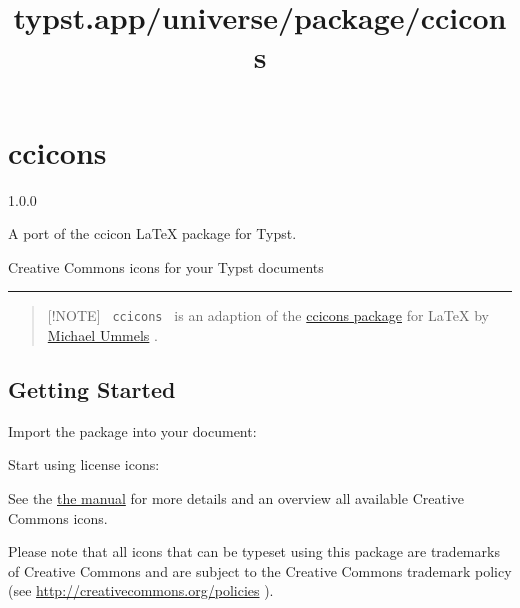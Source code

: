 \title{typst.app/universe/package/ccicons}

\label{banner}
\section{ccicons}\label{ccicons}

{ 1.0.0 }

A port of the ccicon LaTeX package for Typst.

\label{readme}
Creative Commons icons for your Typst documents

\begin{center}\rule{0.5\linewidth}{0.5pt}\end{center}

\begin{quote}
{[}!NOTE{]} \texttt{\ ccicons\ } is an adaption of the
\href{https://ctan.org/pkg/ccicons}{ccicons package} for LaTeX by
\href{https://github.com/ummels}{Michael Ummels} .
\end{quote}

\subsection{Getting Started}\label{getting-started}

Import the package into your document:

\begin{Shaded}
\begin{Highlighting}[]
\end{Highlighting}
\end{Shaded}

Start using license icons:

\begin{Shaded}
\begin{Highlighting}[]
\end{Highlighting}
\end{Shaded}

See the
\href{https://github.com/typst/packages/raw/main/packages/preview/ccicons/1.0.0/docs/ccicons-manual.pdf}{the
manual} for more details and an overview all available Creative Commons
icons.

Please note that all icons that can be typeset using this package are
trademarks of Creative Commons and are subject to the Creative Commons
trademark policy (see \url{http://creativecommons.org/policies} ).

